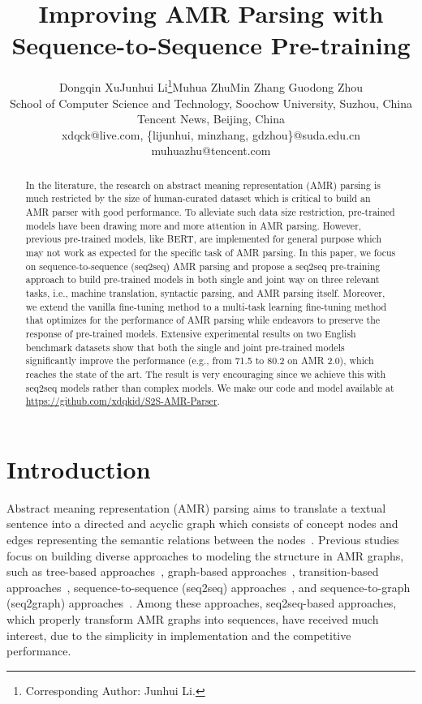 \documentclass[11pt,a4paper]{article}
\title{Improving AMR Parsing with Sequence-to-Sequence Pre-training}
\author{Dongqin Xu\hspace{0.8cm}Junhui Li\thanks{Corresponding Author: Junhui Li.}\hspace{0.8cm}Muhua Zhu\hspace{0.8cm}Min Zhang\hspace{0.8cm} Guodong Zhou\\
School of Computer Science and Technology, Soochow University, Suzhou, China\\
Tencent News, Beijing, China\\
{xdqck@live.com},
{\{lijunhui, minzhang, gdzhou\}@suda.edu.cn}\\
{muhuazhu@tencent.com}
}
\date{}
\begin{document}
\maketitle
\begin{abstract}
In the literature, the research on abstract meaning representation (AMR) parsing is much restricted by the size of human-curated dataset which is critical to build an AMR parser with good performance. To alleviate such data size restriction, pre-trained models have been drawing more and more attention in AMR parsing. However, previous pre-trained models, like BERT, are implemented for general purpose which may not work as expected for the specific task of AMR parsing. In this paper, we focus on sequence-to-sequence (seq2seq) AMR parsing and propose a seq2seq pre-training approach to build pre-trained models in both single and joint way on three relevant tasks, i.e., machine translation, syntactic parsing, and AMR parsing itself. Moreover, we extend the vanilla fine-tuning method to a multi-task learning fine-tuning method that optimizes for the performance of AMR parsing while endeavors to preserve the response of pre-trained models. Extensive experimental results on two English benchmark datasets show that both the single and joint pre-trained models significantly improve the performance (e.g., from 71.5 to 80.2 on AMR 2.0), which reaches the state of the art. The result is very encouraging since we achieve this with seq2seq models rather than complex models. We make our code and model available at \url{https://github.com/xdqkid/S2S-AMR-Parser}.
\end{abstract}

\section{Introduction}

Abstract meaning representation (AMR) parsing aims to translate a textual sentence into a directed and acyclic graph which consists of concept nodes and edges representing the semantic relations between the nodes~\cite{banarescu_etal_aclws_2013}. Previous studies focus on building diverse approaches to modeling the structure in AMR graphs, such as tree-based approaches~\cite{wang_etal_naacl_2015,groschwitz_etal_acl_2018}, graph-based approaches~\cite{flanigan_etal_acl_2014,werling_etal_acl_2015,cai_lam_emnlp_2019}, transition-based approaches~\cite{damonte_etal_eacl_2017,guo_lu_emnlp_2018}, sequence-to-sequence (seq2seq) approaches~\cite{peng_etal_eacl_2017,noord_bos_2017,konstas_etal_acl_2017,ge_etal_ijcai_2019}, and sequence-to-graph (seq2graph) approaches~\cite{zhang_etal_acl_2019,zhang_etal_emnlp_2019,cai_lam_acl_2020}. Among these approaches, seq2seq-based approaches, which properly transform AMR graphs into sequences, have received much interest, due to the simplicity in implementation and the competitive performance.
\end{document}
